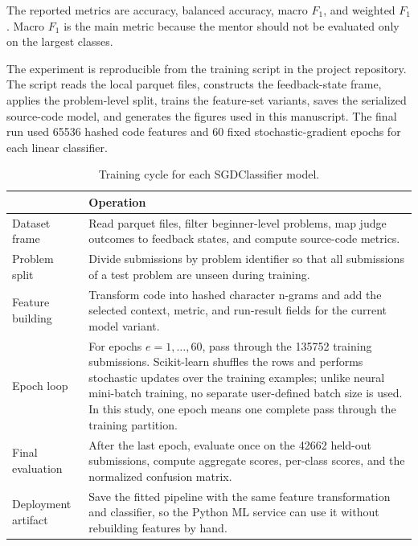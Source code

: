 \documentclass[twoside,11pt]{article}
\begin{document}
The reported metrics are accuracy, balanced accuracy, macro $F_1$, and weighted $F_1$. Macro $F_1$ is the main metric because the mentor should not be evaluated only on the largest classes.

The experiment is reproducible from the training script in the project repository. The script reads the local parquet files, constructs the feedback-state frame, applies the problem-level split, trains the feature-set variants, saves the serialized source-code model, and generates the figures used in this manuscript. The final run used 65536 hashed code features and 60 fixed stochastic-gradient epochs for each linear classifier.

\begin{table}[H]
\centering
\small
\caption{Training cycle for each \hbox{SGDClassifier} model.}
\label{tab:trainingcycle}
\begin{tabular}{|>{\raggedright\arraybackslash}p{31mm}|>{\raggedright\arraybackslash}p{113mm}|}
\hline
{\bf Stage} & {\bf Operation} \\
\hline
Dataset frame & Read parquet files, filter beginner-level problems, map judge outcomes to feedback states, and compute source-code metrics. \\
\hline
Problem split & Divide submissions by problem identifier so that all submissions of a test problem are unseen during training. \\
\hline
Feature building & Transform code into hashed character n-grams and add the selected context, metric, and run-result fields for the current model variant. \\
\hline
Epoch loop & For epochs $e=1,\ldots,60$, pass through the 135752 training submissions. Scikit-learn shuffles the rows and performs stochastic updates over the training examples; unlike neural mini-batch training, no separate user-defined batch size is used. In this study, one epoch means one complete pass through the training partition. \\
\hline
Final evaluation & After the last epoch, evaluate once on the 42662 held-out submissions, compute aggregate scores, per-class scores, and the normalized confusion matrix. \\
\hline
Deployment artifact & Save the fitted pipeline with the same feature transformation and classifier, so the Python ML service can use it without rebuilding features by hand. \\
\hline
\end{tabular}
\end{table}
\end{document}
